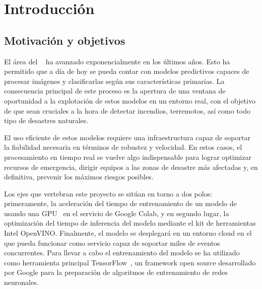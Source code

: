 \cleardoublepage
\chapter{Introducción}
\label{ch:chapter1}


\section{Motivación y objetivos}\label{sec:motivación-y-objetivos}

El área del ~\cite{deep_learning} ha avanzado exponencialmente en los últimos años.
Esto ha permitido que a día de hoy se pueda contar con modelos predictivos capaces de procesar imágenes y clasificarlas según sus características primarias.
La consecuencia principal de este proceso es la apertura de una ventana de oportunidad a la explotación de estos modelos en un entorno real, con el objetivo de que sean cruciales a
la hora de detectar incendios, terremotos, así como todo tipo de desastres naturales.

El uso eficiente de estos modelos requiere una infraestructura capaz de soportar la fiabilidad necesaria en términos de robustez y velocidad.
En estos casos, el procesamiento en tiempo real se vuelve algo indispensable para lograr optimizar recursos de emergencia, dirigir equipos a las zonas de desastre más afectadas y, en definitiva, prevenir los máximos riesgos posibles.


Los ejes que vertebran este proyecto se sitúan en torno a dos polos: primeramente, la aceleración del tiempo de entrenamiento de un modelo de  usando una GPU~\cite{gpu_solution}
en el servicio de Google Colab, y en segundo lugar, la optimización del tiempo de inferencia del modelo mediante el kit de herramientas Intel OpenVINO. Finalmente, el modelo se desplegará en un entorno cloud en el que pueda funcionar como servicio capaz de soportar miles de eventos concurrentes.
Para llevar a cabo el entrenamiento del modelo se ha utilizado como herramienta principal TensorFlow~\cite{deep_learning_tensorflow}, un framework open source desarrollado por Google para la preparación de algoritmos de entrenamiento de redes neuronales.

